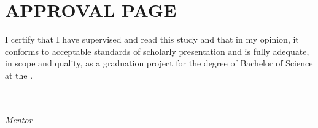 \chapter*{APPROVAL PAGE}

I certify that I have supervised and read this study and that in my opinion, it conforms to acceptable standards of scholarly presentation and is fully adequate, in scope and quality, as a graduation project for the degree of Bachelor of Science at the \FacultyName.

\vspace{2cm}

\begin{flushright}
\makebox[8cm][l]{\dotfill}\\
\Supervisor\\
\emph{Mentor}
\end{flushright}

\clearpage
